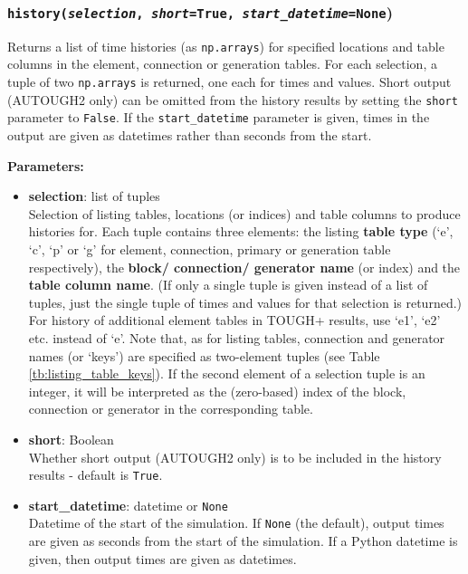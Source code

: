 \begin{snugshade}
\subsubsection{\texttt{history(\emph{selection},  \emph{short}=True, \emph{start\_datetime}=None})}
\end{snugshade}
\label{sec:t2listing:history}

Returns a list of time histories (as \texttt{np.arrays}) for specified locations and table columns in the element, connection or generation tables.  For each selection, a tuple of two \texttt{np.arrays} is returned, one each for times and values.  Short output (AUTOUGH2 only) can be omitted from the history results by setting the \texttt{short} parameter to \texttt{False}. If the \texttt{start\_datetime} parameter is given, times in the output are given as datetimes rather than seconds from the start.

\textbf{Parameters:}
\begin{itemize}

\item \textbf{selection}: list of tuples\\
  Selection of listing tables, locations (or indices) and table columns to produce histories for.  Each tuple contains three elements: the listing \textbf{table type} (`e', `c', `p' or `g' for element, connection, primary or generation table respectively), the \textbf{block/ connection/ generator name} (or index) and the \textbf{table column name}.  (If only a single tuple is given instead of a list of tuples, just the single tuple of times and values for that selection is returned.)  For history of additional element tables in TOUGH+ results, use `e1', `e2' etc. instead of `e'.  Note that, as for listing tables, connection and generator names (or `keys') are specified as two-element tuples (see Table \ref{tb:listing_table_keys}). If the second element of a selection tuple is an integer, it will be interpreted as the (zero-based) index of the block, connection or generator in the corresponding table.

\item \textbf{short}: Boolean\\
  Whether short output (AUTOUGH2 only) is to be included in the history results - default is \texttt{True}.

\item \textbf{start\_datetime}: datetime or \texttt{None}\\
  Datetime of the start of the simulation. If \texttt{None} (the default), output times are given as seconds from the start of the simulation. If a Python datetime is given, then output times are given as datetimes.

\end{itemize}

